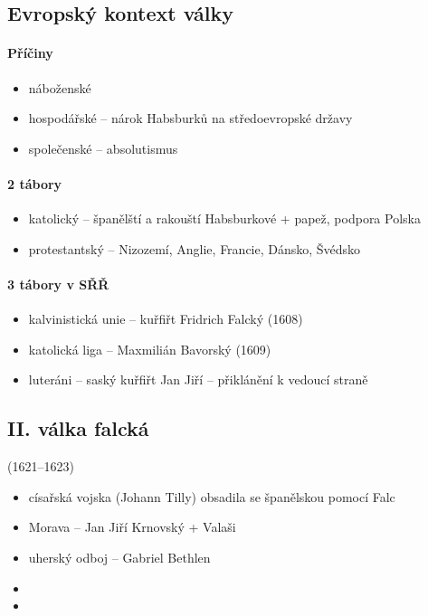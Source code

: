 \subsection{Evropský kontext války}
\paragraph{Příčiny}
\begin{itemize}
\item náboženské
\item hospodářské -- nárok Habsburků na středoevropské državy
\item společenské -- absolutismus
\end{itemize}

\paragraph{2 tábory}
\begin{itemize}
\item katolický -- španělští a rakouští Habsburkové + papež, podpora Polska
\item protestantský -- Nizozemí, Anglie, Francie, Dánsko, Švédsko
\end{itemize}

\paragraph{3 tábory v SŘŘ}
\begin{itemize}
\item kalvinistická unie -- kuřfiřt Fridrich Falcký (1608)
\item katolická liga -- Maxmilián Bavorský (1609)
\item luteráni -- saský kuřfiřt Jan Jiří -- přiklánění k vedoucí straně
\end{itemize}

\subsection{II. válka falcká}(1621--1623)
\begin{itemize}
\item císařská vojska (Johann Tilly) obsadila se španělskou pomocí Falc
\item Morava -- Jan Jiří Krnovský + Valaši
\item uherský odboj -- Gabriel Bethlen
\item {}
\item {}
\end{itemize}

